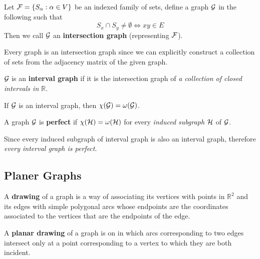 \documentclass{article}
\def\R{{\mathbb R}}
\begin{document}
			\begin{definition}
				Let $\mathcal{{F}} = \{S_\alpha: \alpha \in V\}$ be an indexed family of sets, define a graph $\mathcal{{G}}$ in the following such that 
				\begin{equation}
					S_x \cap S_y \neq \emptyset \iff xy \in E
				\end{equation}
				Then we call $\mathcal{{G}}$ an \textbf{intersection graph} (representing $\mathcal{{F}}$).
			\end{definition}
			
			\begin{remark}
				Every graph is an intersection graph since we can explicitly construct a collection of sets from the adjacency matrix of the given graph.
			\end{remark}
			
			\begin{definition}
				$\mathcal{{G}}$ is an \textbf{interval graph} if it is the intersection graph of \emph{a collection of closed intervals in $\R$}.
			\end{definition}
			
			\begin{theorem}
				If $\mathcal{{G}}$ is an interval graph, then $\chi(\mathcal{{G}}) = \omega(\mathcal{{G}})$.
			\end{theorem}
			
			\begin{definition}
				A graph $\mathcal{{G}}$ is \textbf{perfect} if $\chi(\mathcal{{H}}) = \omega(\mathcal{{H}})$ for every \emph{induced subgraph} $\mathcal{{H}}$ of $\mathcal{{G}}$.
			\end{definition}
			
			\begin{corollary}
				Since every induced subgraph of interval graph is also an interval graph, therefore \emph{every interval graph is perfect}.
			\end{corollary}
		
		\subsection{Planer Graphs}
			\begin{definition}
				A \textbf{drawing} of a graph is a way of associating its vertices with points in $\R^2$ and its edges with simple polygonal arcs whose endpoints are the coordinates associated to the vertices that are the endpoints of the edge.
			\end{definition}
			
			\begin{definition}
				A \textbf{planar drawing} of a graph is on in which arcs corresponding to two edges intersect only at a point corresponding to a vertex to which they are both incident.
			\end{definition}
\end{document}
